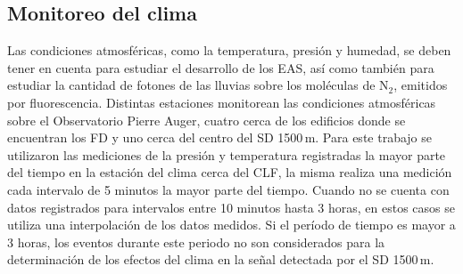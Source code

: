 \subsection{Monitoreo del clima}\label{seccion:clima}

Las condiciones atmosféricas, como la temperatura, presión y humedad, se deben tener en cuenta para estudiar el desarrollo de los EAS, así como también para estudiar la cantidad de fotones de las lluvias sobre los moléculas de N$_2$, emitidos por fluorescencia. Distintas estaciones monitorean las condiciones atmosféricas sobre el Observatorio Pierre Auger, cuatro cerca  de los edificios donde se encuentran los FD y uno cerca del centro del SD 1500\,m. Para este trabajo se utilizaron las mediciones de la presión y temperatura registradas la mayor parte del tiempo en la estación del clima cerca del CLF, la misma realiza una medición cada intervalo de 5 minutos la mayor parte del tiempo. Cuando no se cuenta con datos registrados para intervalos entre 10 minutos hasta 3 horas, en estos casos se utiliza una interpolación de los datos medidos. Si el período de tiempo es mayor a 3 horas, los eventos durante este periodo no son considerados para la determinación de los efectos del clima en la señal detectada por el SD 1500\,m.
